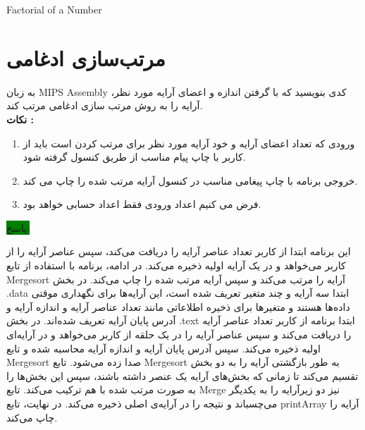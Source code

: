 \begin{latin}
\begin{listing}[ht]
    \inputminted[linenos=true]{asm}{sources/Factorial_of_a_Number.mips}
    \caption{Factorial of a Number}
    \label{listing:}
\end{listing}
\end{latin}
 

\clearpage
\section{مرتب‌سازی ادغامی}
{به زبان MIPS Assembly کدی بنویسید که با گرفتن اندازه و اعضای آرایه مورد نظر، آرایه را به روش مرتب سازی ادغامی مرتب کند.}\\
\bf {نکات :}
\normalfont
\begin{enumerate}
    \item {ورودی که تعداد اعضای آرایه و خود آرایه مورد نظر برای مرتب کردن است باید از کاربر با چاپ پیام مناسب از طریق کنسول گرفته شود.}
    \item {خروجی برنامه با چاپ پیغامی مناسب در کنسول آرایه مرتب شده را چاپ می کند.}
    \item {فرض می کنیم اعداد ورودی فقط اعداد حسابی خواهد بود.}
\end{enumerate}
\colorbox{green}{پاسخ:}\\
\normalfont

{این برنامه ابتدا از کاربر تعداد عناصر آرایه را دریافت می‌کند، سپس عناصر آرایه را از کاربر می‌خواهد و در یک آرایه اولیه ذخیره می‌کند. در ادامه، برنامه با استفاده از تابع Mergesort آرایه را مرتب می‌کند و سپس آرایه مرتب شده را چاپ می‌کند.
در بخش .data ابتدا سه آرایه و چند متغیر تعریف شده است، این آرایه‌ها برای نگهداری موقتی داده‌ها هستند و متغیرها برای ذخیره اطلاعاتی مانند تعداد عناصر آرایه و اندازه آرایه و آدرس پایان آرایه تعریف شده‌اند.
در بخش .text ابتدا برنامه از کاربر تعداد عناصر آرایه را دریافت می‌کند و سپس عناصر آرایه را در یک حلقه از کاربر می‌خواهد و در آرایه‌ای اولیه ذخیره می‌کند.
سپس آدرس پایان آرایه و اندازه آرایه محاسبه شده و تابع Mergesort صدا زده می‌شود.
تابع Mergesort به طور بازگشتی آرایه را به دو بخش تقسیم می‌کند تا زمانی که بخش‌های آرایه یک عنصر داشته باشند، سپس این بخش‌ها را به صورت مرتب شده با هم ترکیب می‌کند.
تابع Merge نیز دو زیرآرایه را به یکدیگر می‌چسباند و نتیجه را در آرایه‌ی اصلی ذخیره می‌کند.
در نهایت، تابع printArray آرایه را چاپ می‌کند.}

